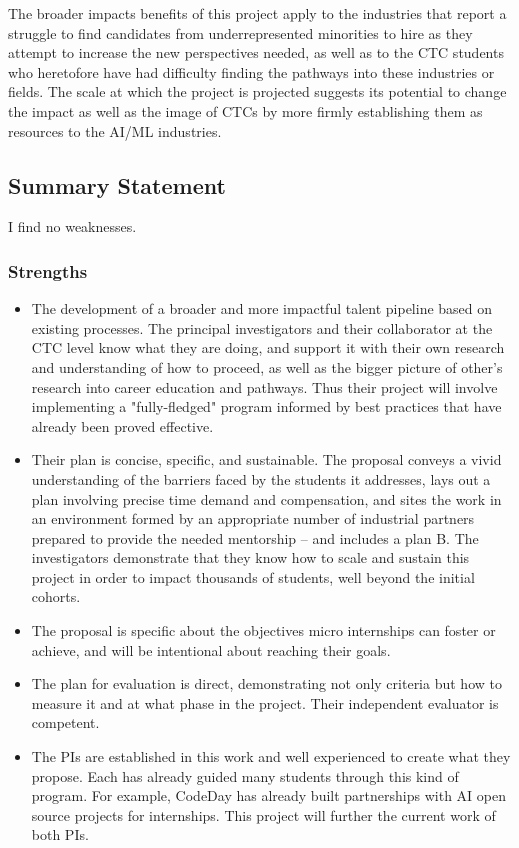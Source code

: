 The broader impacts benefits of this project apply to the industries that report a struggle to find candidates from underrepresented minorities to hire as they attempt to increase the new perspectives needed, as well as to the CTC students who heretofore have had difficulty finding the pathways into these industries or fields. The scale at which the project is projected suggests its potential to change the impact as well as the image of CTCs by more firmly establishing them as resources to the AI/ML industries. 

\subsection{Summary Statement} 

I find no weaknesses. 

\subsubsection{Strengths}

\begin{itemize}
\item The development of a broader and more impactful talent pipeline based on existing processes. The principal investigators and their collaborator at the CTC level know what they are doing, and support it with their own research and understanding of how to proceed, as well as the bigger picture of other's research into career education and pathways. Thus their project will involve implementing a "fully-fledged" program informed by best practices that have already been proved effective. 

\item Their plan is concise, specific, and sustainable. The proposal conveys a vivid understanding of the barriers faced by the students it addresses, lays out a plan involving precise time demand and compensation, and sites the work in an environment formed by an appropriate number of industrial partners prepared to provide the needed mentorship -- and includes a plan B. The investigators demonstrate that they know how to scale and sustain this project in order to impact thousands of students, well beyond the initial cohorts. 

\item The proposal is specific about the objectives micro internships can foster or achieve, and will be intentional about reaching their goals. 

\item The plan for evaluation is direct, demonstrating not only criteria but how to measure it and at what phase in the project. Their independent evaluator is competent.

\item The PIs are established in this work and well experienced to create what they propose. Each has already guided many students through this kind of program. For example, CodeDay has already built partnerships with AI open source projects for internships. This project will further the current work of both PIs.
\end{itemize}

